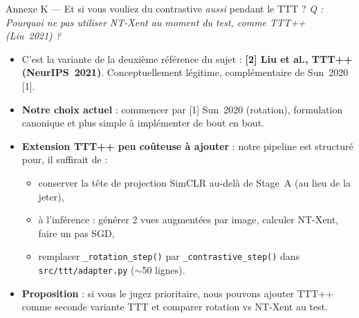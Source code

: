 \documentclass[10pt,aspectratio=169]{beamer}
\newcommand{\code}[1]{\texttt{\small #1}}
\newcommand{\qbox}[1]{\textit{\textcolor{accent}{Q : #1}}\par\smallskip}
\begin{document}
\begin{frame}{Annexe K --- Et si vous vouliez du contrastive \emph{aussi} pendant le TTT ?}
  \qbox{\guillemotleft\,Pourquoi ne pas utiliser NT-Xent au moment du test, comme TTT++ (Liu~2021) ?\,\guillemotright{}}

  \begin{itemize}
    \item C'est la variante de la deuxième référence du sujet : \textbf{[2] Liu et al., TTT++ (NeurIPS~2021)}. Conceptuellement légitime, complémentaire de Sun~2020 [1].
    \item \textbf{Notre choix actuel} : commencer par [1] Sun~2020 (rotation), formulation canonique et plus simple à implémenter de bout en bout.
    \item \textbf{Extension TTT++ peu coûteuse à ajouter} : notre pipeline est structuré pour, il suffirait de :
    \begin{itemize}\small
      \item conserver la tête de projection SimCLR au-delà de Stage~A (au lieu de la jeter),
      \item à l'inférence : générer 2 vues augmentées par image, calculer NT-Xent, faire un pas SGD,
      \item remplacer \code{\_rotation\_step()} par \code{\_contrastive\_step()} dans \code{src/ttt/adapter.py} ($\sim$50 lignes).
    \end{itemize}
    \item \textbf{Proposition} : si vous le jugez prioritaire, nous pouvons ajouter TTT++ comme seconde variante TTT et comparer rotation vs NT-Xent au test.
  \end{itemize}
\end{frame}
\end{document}
